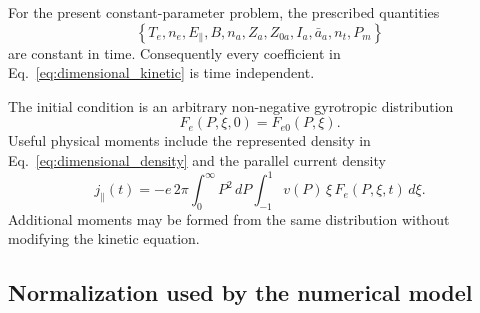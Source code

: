 \documentclass[11pt]{article}
\begin{document}
For the present constant-parameter problem, the prescribed quantities
\begin{equation}
 \left\{T_e,n_e,E_\parallel,B,n_a,Z_a,Z_{0a},I_a,\bar a_a,n_t,P_m\right\}
\end{equation}
are constant in time.  Consequently every coefficient in
Eq.~\eqref{eq:dimensional_kinetic} is time independent.

The initial condition is an arbitrary non-negative gyrotropic distribution
\begin{equation}
 F_e(P,\xi,0)=F_{e0}(P,\xi).
 \label{eq:dimensional_initial_condition}
\end{equation}
Useful physical moments include the represented density in
Eq.~\eqref{eq:dimensional_density} and the parallel current density
\begin{equation}
 j_\parallel(t)
 =-e\,2\pi\int_0^\infty P^2\,dP\int_{-1}^{1}
  v(P)\,\xi\,F_e(P,\xi,t)\,d\xi.
 \label{eq:dimensional_current}
\end{equation}
Additional moments may be formed from the same distribution without modifying the
kinetic equation.

\subsection{Normalization used by the numerical model}
\label{sec:normalization}
\end{document}
